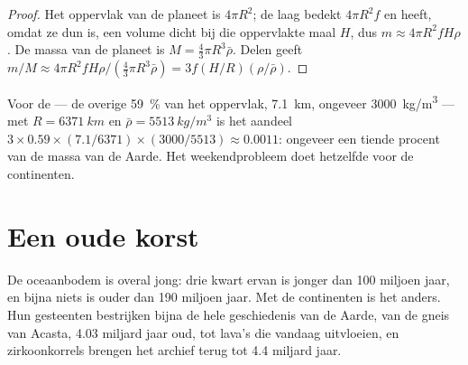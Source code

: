 \begin{proof}
Het oppervlak van de planeet is $4\pi R^2$; de laag bedekt $4\pi R^2 f$ en heeft,
omdat ze dun is, een volume dicht bij die oppervlakte maal $H$, dus $m \approx 4\pi R^2
f H \rho$. De massa van de planeet is $M = \tfrac{4}{3}\pi R^3 \bar\rho$. Delen geeft
$m/M \approx 4\pi R^2 f H \rho / (\tfrac{4}{3}\pi R^3 \bar\rho) = 3 f (H/R)
(\rho/\bar\rho)$.
\end{proof}

Voor de  --- de overige \qty{59}{\percent} van het oppervlak,
\qty{7.1}{km}, ongeveer \qty{3000}{kg/m^3} --- met $R = \qty{6371}{km}$ en
$\bar\rho = \qty{5513}{kg/m^3}$ is het aandeel $3 \times 0.59 \times
(7.1/6371) \times (3000/5513) \approx 0.0011$: ongeveer een tiende procent van
de massa van de Aarde. Het weekendprobleem doet hetzelfde voor de continenten.

\section{Een oude korst}

De oceaanbodem is overal jong: drie kwart ervan is jonger dan
100 miljoen jaar, en bijna niets is ouder dan 190 miljoen jaar. Met de
continenten is het anders. Hun gesteenten bestrijken bijna de hele geschiedenis van
de Aarde, van de gneis van Acasta, 4.03 miljard jaar oud, tot lava's die vandaag
uitvloeien, en zirkoonkorrels brengen het archief terug tot 4.4 miljard jaar.


